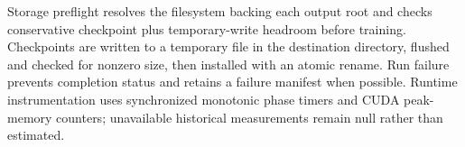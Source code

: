 Storage preflight resolves the filesystem backing each output root and checks
conservative checkpoint plus temporary-write headroom before training.
Checkpoints are written to a temporary file in the destination directory,
flushed and checked for nonzero size, then installed with an atomic rename.
Run failure prevents completion status and retains a failure manifest when
possible.  Runtime instrumentation uses synchronized monotonic phase timers
and CUDA peak-memory counters; unavailable historical measurements remain
null rather than estimated.
